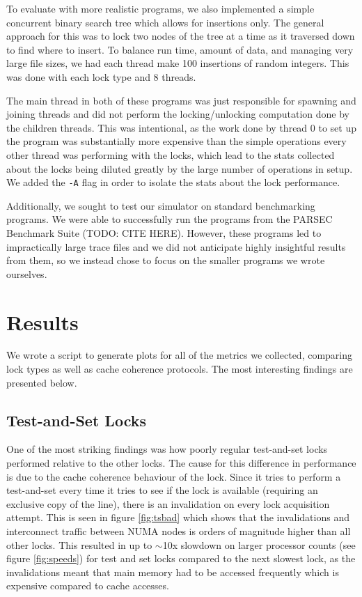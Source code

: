 \documentclass{article}
\begin{document}
To evaluate with more realistic programs, we also implemented a simple concurrent binary search tree which allows for insertions only.  The general approach for this was to lock two nodes of the tree at a time as it traversed down to find where to insert.  To balance run time, amount of data, and managing very large file sizes, we had each thread make 100 insertions of random integers.  This was done with each lock type and 8 threads.

The main thread in both of these programs was just responsible for spawning and joining threads and did not perform the locking/unlocking computation done by the children threads.  This was intentional, as the work done by thread 0 to set up the program was substantially more expensive than the simple operations every other thread was performing with the locks, which lead to the stats collected about the locks being diluted greatly by the large number of operations in setup.  We added the {\tt -A} flag in order to isolate the stats about the lock performance.

Additionally, we sought to test our simulator on standard benchmarking programs.  We were able to successfully run the programs from the PARSEC Benchmark Suite (TODO: CITE HERE).  However, these programs led to impractically large trace files and we did not anticipate highly insightful results from them, so we instead chose to focus on the smaller programs we wrote ourselves.

\section{Results}

We wrote a script to generate plots for all of the metrics we collected, comparing lock types as well as cache coherence protocols. The most interesting findings are presented below.

\subsection{Test-and-Set Locks}
One of the most striking findings was how poorly regular test-and-set locks performed relative to the other locks.  The cause for this difference in performance is due to the cache coherence behaviour of the lock. Since it tries to perform a test-and-set every time it tries to see if the lock is available (requiring an exclusive copy of the line), there is an invalidation on every lock acquisition attempt.  This is seen in figure \ref{fig:tsbad} which shows that the invalidations and interconnect traffic between NUMA nodes is orders of magnitude higher than all other locks. This resulted in up to $\sim$10x slowdown on larger processor counts (see figure \ref{fig:speeds}) for test and set locks compared to the next slowest lock, as the invalidations meant that main memory had to be accessed frequently which is expensive compared to cache accesses.
\end{document}
